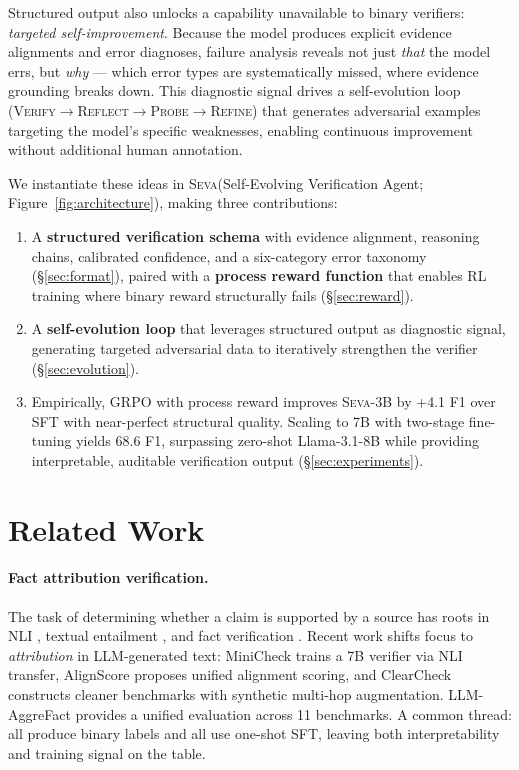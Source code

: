 \documentclass[11pt]{article}
\newcommand{\seva}{\textsc{Seva}\xspace}
\begin{document}
Structured output also unlocks a capability unavailable to binary verifiers: \emph{targeted self-improvement}.
Because the model produces explicit evidence alignments and error diagnoses, failure analysis reveals not just \emph{that} the model errs, but \emph{why} --- which error types are systematically missed, where evidence grounding breaks down.
This diagnostic signal drives a self-evolution loop (\textsc{Verify}$\to$\textsc{Reflect}$\to$\textsc{Probe}$\to$\textsc{Refine}) that generates adversarial examples targeting the model's specific weaknesses, enabling continuous improvement without additional human annotation.

We instantiate these ideas in \seva (Self-Evolving Verification Agent; Figure~\ref{fig:architecture}), making three contributions:
\begin{enumerate}[nosep,leftmargin=*]
  \item A \textbf{structured verification schema} with evidence alignment, reasoning chains, calibrated confidence, and a six-category error taxonomy (\S\ref{sec:format}), paired with a \textbf{process reward function} that enables RL training where binary reward structurally fails (\S\ref{sec:reward}).
  \item A \textbf{self-evolution loop} that leverages structured output as diagnostic signal, generating targeted adversarial data to iteratively strengthen the verifier (\S\ref{sec:evolution}).
  \item Empirically, GRPO with process reward improves \seva-3B by +4.1 F1 over SFT with near-perfect structural quality.
  Scaling to 7B with two-stage fine-tuning yields 68.6 F1, surpassing zero-shot Llama-3.1-8B while providing interpretable, auditable verification output (\S\ref{sec:experiments}).
\end{enumerate}


\section{Related Work}
\label{sec:related}

\paragraph{Fact attribution verification.}
The task of determining whether a claim is supported by a source has roots in NLI \citep{bowman2015snli}, textual entailment \citep{dagan2005pascal}, and fact verification \citep{thorne2018fever}.
Recent work shifts focus to \emph{attribution} in LLM-generated text: MiniCheck \citep{tang2024minicheck} trains a 7B verifier via NLI transfer, AlignScore \citep{zha2023alignscore} proposes unified alignment scoring, and ClearCheck \citep{seo2025vtv} constructs cleaner benchmarks with synthetic multi-hop augmentation.
LLM-AggreFact \citep{tang2024llmaggrefact} provides a unified evaluation across 11 benchmarks.
A common thread: all produce binary labels and all use one-shot SFT, leaving both interpretability and training signal on the table.
\end{document}
